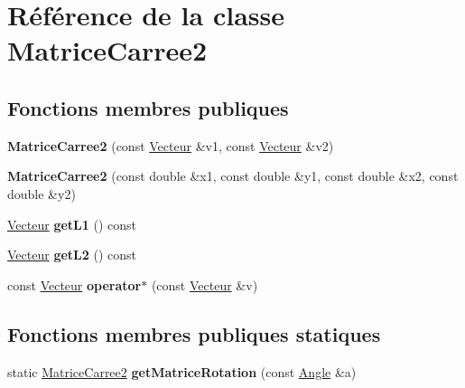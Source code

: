 \hypertarget{class_matrice_carree2}{\section{Référence de la classe Matrice\+Carree2}
\label{class_matrice_carree2}
}
\subsection*{Fonctions membres publiques}
\begin{DoxyCompactItemize}
\item 
\hypertarget{class_matrice_carree2_a9d9bf4f1ef2cef83ced50ca797f765c2}{{\bfseries Matrice\+Carree2} (const \hyperlink{class_vecteur}{Vecteur} \&v1, const \hyperlink{class_vecteur}{Vecteur} \&v2)}\label{class_matrice_carree2_a9d9bf4f1ef2cef83ced50ca797f765c2}

\item 
\hypertarget{class_matrice_carree2_a1a28b1973d81290e9ac9cad3c17d2699}{{\bfseries Matrice\+Carree2} (const double \&x1, const double \&y1, const double \&x2, const double \&y2)}\label{class_matrice_carree2_a1a28b1973d81290e9ac9cad3c17d2699}

\item 
\hypertarget{class_matrice_carree2_a466c402680f683fa16b64723ec5a7e17}{\hyperlink{class_vecteur}{Vecteur} {\bfseries get\+L1} () const }\label{class_matrice_carree2_a466c402680f683fa16b64723ec5a7e17}

\item 
\hypertarget{class_matrice_carree2_aa7e0d89fbb3608ec81df059fb771c944}{\hyperlink{class_vecteur}{Vecteur} {\bfseries get\+L2} () const }\label{class_matrice_carree2_aa7e0d89fbb3608ec81df059fb771c944}

\item 
\hypertarget{class_matrice_carree2_aeda80c8a5ed6c8b0c20916e18ce00897}{const \hyperlink{class_vecteur}{Vecteur} {\bfseries operator$\ast$} (const \hyperlink{class_vecteur}{Vecteur} \&v)}\label{class_matrice_carree2_aeda80c8a5ed6c8b0c20916e18ce00897}

\end{DoxyCompactItemize}
\subsection*{Fonctions membres publiques statiques}
\begin{DoxyCompactItemize}
\item 
\hypertarget{class_matrice_carree2_aa58d3933eb2fa12915ea3a048d6b28d0}{static \hyperlink{class_matrice_carree2}{Matrice\+Carree2} {\bfseries get\+Matrice\+Rotation} (const \hyperlink{class_angle}{Angle} \&a)}\label{class_matrice_carree2_aa58d3933eb2fa12915ea3a048d6b28d0}

\end{DoxyCompactItemize}
